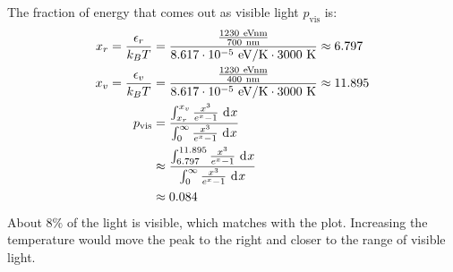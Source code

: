 \documentclass{article}
\begin{document}
The fraction of energy that comes out as visible light $p_{\text{vis}}$ is:
\begin{equation}
    \begin{split}
        x_r = \frac{\epsilon_r}{k_BT} & = \frac{\frac{1230~\unit{eV\nano\meter}}{700~\unit{\nano\meter}}}{8.617 \cdot 10^{-5}~\unit{eV\per\kelvin} \cdot 3000~\unit{\kelvin}} \approx 6.797 \\
        x_v = \frac{\epsilon_v}{k_BT} & = \frac{\frac{1230~\unit{eV\nano\meter}}{400~\unit{\nano\meter}}}{8.617 \cdot 10^{-5}~\unit{eV\per\kelvin} \cdot 3000~\unit{\kelvin}}  \approx 11.895 \\
        p_{\text{vis}} & = \frac{\int_{x_r}^{x_v} \frac{x^3}{e^x - 1} \, \diff{x}}{\int_{0}^{\infty} \frac{x^3}{e^x - 1} \, \diff{x}} \\
        & \approx \frac{\int_{6.797}^{11.895} \frac{x^3}{e^x - 1} \, \diff{x}}{\int_{0}^{\infty} \frac{x^3}{e^x - 1} \, \diff{x}} \\
        & \approx 0.084
    \end{split}
\end{equation}
About $8\%$ of the light is visible, which matches with the plot.
Increasing the temperature would move the peak to the right and closer to the range of visible light.

\clearpage
\end{document}
